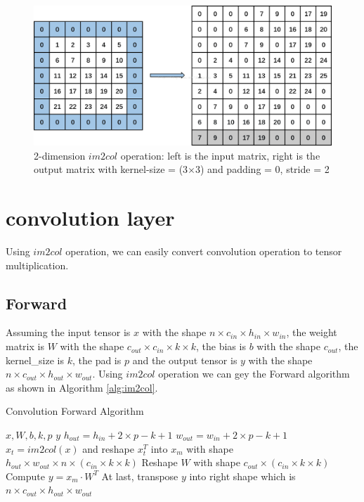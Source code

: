 \documentclass{elegantbook}
\begin{document}
\begin{figure}[!ht]
	\centering
	\includegraphics[width=\linewidth]{im2col}
	\caption{\label{im2col}2-dimension $im2col$ operation: left is the input matrix, right is the output matrix with kernel-size = (3$\times$3) and padding = 0, stride = 2}
\end{figure}


\section{convolution layer}
Using $im2col$ operation, we can easily convert convolution operation to tensor multiplication.

\subsection{Forward}
Assuming the input tensor is $x$ with the shape $n\times c_{in}\times h_{in}\times w_{in}$, the weight matrix is $W$ with the shape $c_{out}\times c_{in}\times k\times k$, the bias is $b$ with the shape $c_{out}$, the kernel\_size is $k$, the pad is $p$ and the output tensor is $y$ with the shape$n\times c_{out}\times h_{out}\times w_{out}$. Using $im2col$ operation we can gey the Forward algorithm as shown in Algorithm \ref{alg:im2col}.

\begin{algorithm}[htb]
	\caption{Convolution Forward Algorithm}
	\label{alg:im2col}
	\begin{algorithmic}[1]
		\REQUIRE $x, W, b, k, p$
		\ENSURE $y$
		\STATE $h_{out}=h_{in}+2\times p-k+1$
		\STATE $w_{out}=w_{in}+2\times p-k+1$
		\STATE $x_t=im2col(x)$ and reshape $x_t^T$ into $x_m$ with shape $h_{out}\times w_{out}\times n\times (c_{in}\times k\times k)$
		\STATE Reshape $W$ with shape $c_{out} \times (c_{in}\times k\times k)$
		\STATE Compute $y=x_m\cdot W^T$
		\STATE At last, transpose $y$ into right shape which is $n\times c_{out}\times h_{out}\times w_{out}$
	\end{algorithmic}
\end{algorithm}
\end{document}
